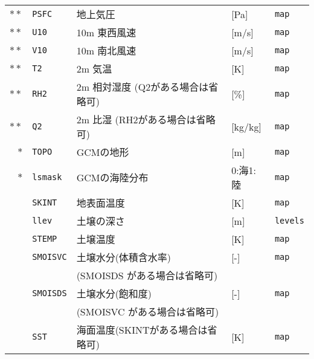 {\begin{table}[hbt]
\begin{center}
\begin{tabularx}{150mm}{rl|l|l|l}
$\ast\ast$ &\verb|PSFC|    & 地上気圧        & [Pa]     & \verb|map| \\
$\ast\ast$ &\verb|U10|     & 10m 東西風速    & [m/s]    & \verb|map| \\
$\ast\ast$ &\verb|V10|     & 10m 南北風速    & [m/s]    & \verb|map| \\
$\ast\ast$ &\verb|T2|      & 2m 気温         & [K]      & \verb|map| \\
$\ast\ast$ &\verb|RH2|     & 2m 相対湿度 (Q2がある場合は省略可) & [\%]  & \verb|map| \\
$\ast\ast$ &\verb|Q2|      & 2m 比湿 (RH2がある場合は省略可)   &[kg/kg] & \verb|map| \\
    $\ast$ &\verb|TOPO|    & GCMの地形                      & [m]      & \verb|map| \\
    $\ast$ &\verb|lsmask|  & GCMの海陸分布                   & 0:海1:陸 & \verb|map| \\
           &\verb|SKINT|   & 地表面温度                      & [K]      & \verb|map| \\
           &\verb|llev|    & 土壌の深さ                      & [m]      & \verb|levels| \\
           &\verb|STEMP|   & 土壌温度                        & [K]      & \verb|map| \\
           &\verb|SMOISVC| & 土壌水分(体積含水率)             & [-] & \verb|map| \\
           &               & (SMOISDS がある場合は省略可)     &                &                    \\
           &\verb|SMOISDS| & 土壌水分(飽和度)                & [-] & \verb|map| \\
           &               & (SMOISVC がある場合は省略可)     &                &                    \\
           &\verb|SST|     & 海面温度(SKINTがある場合は省略可) & [K] & \verb|map|\\ \hline
\end{tabularx}
\end{center}
\end{table}
}
